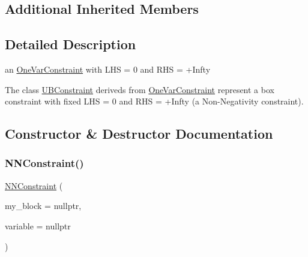 \subsection*{Additional Inherited Members}


\subsection{Detailed Description}
an \mbox{\hyperlink{class_s_m_spp__di__unipi__it_1_1_one_var_constraint}{One\+Var\+Constraint}} with L\+HS = 0 and R\+HS = +\+Infty 

The class \mbox{\hyperlink{class_s_m_spp__di__unipi__it_1_1_u_b_constraint}{U\+B\+Constraint}} deriveds from \mbox{\hyperlink{class_s_m_spp__di__unipi__it_1_1_one_var_constraint}{One\+Var\+Constraint}} represent a box constraint with fixed L\+HS = 0 and R\+HS = +\+Infty (a Non-\/\+Negativity constraint). 

\subsection{Constructor \& Destructor Documentation}
\mbox{\label{class_s_m_spp__di__unipi__it_1_1_n_n_constraint_a13f5a366f81cae0512e155e7ce9d32d0}} 
\subsubsection{\texorpdfstring{N\+N\+Constraint()}{NNConstraint()}}
{\footnotesize\ttfamily \mbox{\hyperlink{class_s_m_spp__di__unipi__it_1_1_n_n_constraint}{N\+N\+Constraint}} (\begin{DoxyParamCaption}\item[{\mbox{\hyperlink{class_s_m_spp__di__unipi__it_1_1_block}{Block}} $\ast$}]{my\+\_\+block = {\ttfamily nullptr},  }\item[{\mbox{\hyperlink{class_s_m_spp__di__unipi__it_1_1_col_variable}{Col\+Variable}} $\ast$const}]{variable = {\ttfamily nullptr} }\end{DoxyParamCaption})\hspace{0.3cm}{\ttfamily [inline]}}



